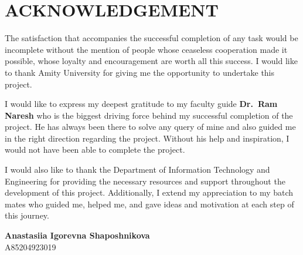 \chapter*{ACKNOWLEDGEMENT}

The satisfaction that accompanies the successful completion of any task would be incomplete
without the mention of people whose ceaseless cooperation made it possible, whose loyalty
and encouragement are worth all this success. I would like to thank Amity University for
giving me the opportunity to undertake this project.

I would like to express my deepest gratitude to my faculty guide \textbf{Dr.\ Ram Naresh}
who is the biggest driving force behind my successful completion of the project. He has
always been there to solve any query of mine and also guided me in the right direction
regarding the project. Without his help and inspiration, I would not have been able to
complete the project.

I would also like to thank the Department of Information Technology and Engineering for
providing the necessary resources and support throughout the development of this project.
Additionally, I extend my appreciation to my batch mates who guided me, helped me, and
gave ideas and motivation at each step of this journey.

\vspace{1.5cm}
\noindent\textbf{Anastasiia Igorevna Shaposhnikova}\\
A85204923019
